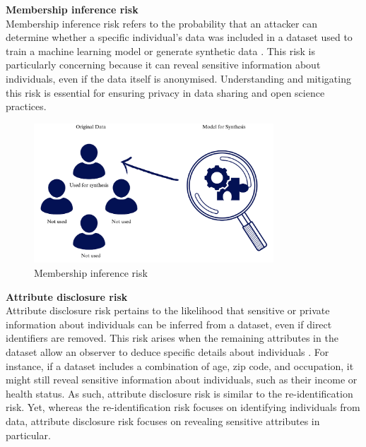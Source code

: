 \textbf{Membership inference risk} \\
Membership inference risk refers to the probability that an attacker can determine whether a specific individual's data was included in a dataset used to train a machine learning model or generate synthetic data \cite{hyeong2022empirical}. This risk is particularly concerning because it can reveal sensitive information about individuals, even if the data itself is anonymised. Understanding and mitigating this risk is essential for ensuring privacy in data sharing and open science practices.

\vspace{10pt}
\begin{figure}[H]
    \centering
    \includegraphics[width=0.8\textwidth]{Images/membershipinference.png}
    \caption{Membership inference risk}
    \label{fig:synthesis_1}
\end{figure}
\vspace{10pt}

\textbf{Attribute disclosure risk}\\
Attribute disclosure risk pertains to the likelihood that sensitive or private information about individuals can be inferred from a dataset, even if direct identifiers are removed. This risk arises when the remaining attributes in the dataset allow an observer to deduce specific details about individuals \cite{hittmeir2020baseline}. For instance, if a dataset includes a combination of age, zip code, and occupation, it might still reveal sensitive information about individuals, such as their income or health status. As such, attribute disclosure risk is similar to the re-identification risk. Yet, whereas the re-identification risk focuses on identifying individuals from data, attribute disclosure risk focuses on revealing sensitive attributes in particular. 

